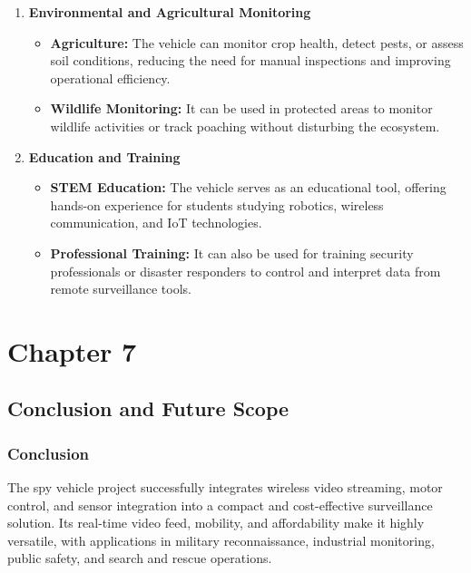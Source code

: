 \documentclass[12pt,a4paper]{report}
\begin{document}
\begin{enumerate}
    \item \textbf{Environmental and Agricultural Monitoring}
    \begin{itemize}
        \item \textbf{Agriculture:} The vehicle can monitor crop health, detect pests, or assess soil conditions, reducing the need for manual inspections and improving operational efficiency.
        \item \textbf{Wildlife Monitoring:} It can be used in protected areas to monitor wildlife activities or track poaching without disturbing the ecosystem.
    \end{itemize}
    
    \item \textbf{Education and Training}
    \begin{itemize}
        \item \textbf{STEM Education:} The vehicle serves as an educational tool, offering hands-on experience for students studying robotics, wireless communication, and IoT technologies.
        \item \textbf{Professional Training:} It can also be used for training security professionals or disaster responders to control and interpret data from remote surveillance tools.
    \end{itemize}
\end{enumerate}







	{\vfill \chapter*{\centering \vfill Chapter 7 \vfill}\vfill}
	\thispagestyle{empty}
	\newpage
	\label{Conclusion and Future Scope}


\section{Conclusion and Future Scope}

\label{Conclusion}
\subsection{Conclusion}
The spy vehicle project successfully integrates wireless video streaming, motor control, and sensor integration into a compact and cost-effective surveillance solution. Its real-time video feed, mobility, and affordability make it highly versatile, with applications in military reconnaissance, industrial monitoring, public safety, and search and rescue operations.
\end{document}
